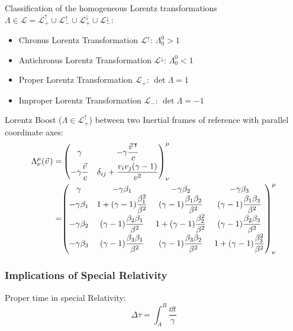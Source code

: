 			\noindent
			Classification of the homogeneous Lorentz transformations $\Lambda \in \mathcal{L} = \mathcal{L}^\uparrow_+ \cup \mathcal{L}^\uparrow_- \cup \mathcal{L}^\downarrow_+ \cup \mathcal{L}^\downarrow_-$:
			\begin{itemize}
				\item Chronus Lorentz Transformation $\mathcal{L}^\uparrow$: $\Lambda^0_0 > 1$
				\item Antichronus Lorentz Transformation $\mathcal{L}^\downarrow$: $\Lambda^0_0 < 1$
				\item Proper Lorentz Transformation $\mathcal{L}_+$: $\det\Lambda = 1$
				\item Improper Lorentz Transformation $\mathcal{L}_-$: $\det\Lambda = -1$
			\end{itemize}

			\noindent
			Lorentz Boost ($\Lambda\in\mathcal{L}^\uparrow_+$) between two Inertial frames of reference with parallel coordinate axes:
			\begin{equation}
				\begin{aligned}
					\Lambda^{\mu}_{\nu}(\vec{v})
					=& \left( \begin{matrix}
						\gamma                    & -\gamma\dfrac{\vec{v}^\trp}{c}                \\[6pt]
						-\gamma\dfrac{\vec{v}}{c} & \delta_{ij}+\dfrac{v_i v_j(\gamma-1)}{v^2}
					\end{matrix} \right)^{\mu}_{\nu} \\
					=&
					\mqty(
					\gamma & -\gamma \beta_1 & -\gamma \beta_2 & -\gamma \beta_3 \\
					-\gamma \beta_1 & 1+(\gamma -1){\dfrac {\beta_1^{2}}{\beta^{2}}} & (\gamma -1){\dfrac {\beta_1 \beta_2}{\beta^{2}}}&(\gamma -1){\dfrac {\beta_1\beta_3}{\beta^{2}}} \\
					-\gamma \beta_2 & (\gamma -1){\dfrac {\beta_2\beta_1}{\beta^{2}}} & 1+(\gamma -1){\dfrac {\beta_2^{2}}{\beta^{2}}}&(\gamma -1){\dfrac {\beta_2 \beta_3}{\beta^{2}}} \\
					-\gamma \beta_3 &(\gamma -1){\dfrac {\beta_3\beta_1}{\beta^{2}}}&(\gamma -1){\dfrac {\beta_3\beta_2}{\beta^{2}}}&1+(\gamma -1){\dfrac {\beta_3^{2}}{\beta^{2}}}
					)^{\mu}_{\nu}
				\end{aligned}
			\end{equation}

		\subsubsection{Implications of Special Relativity}
			\noindent
			Proper time in special Relativity:
			\begin{equation}
				\Delta\tau = \int_A^B \frac{\dd t}{\gamma}
			\end{equation}

